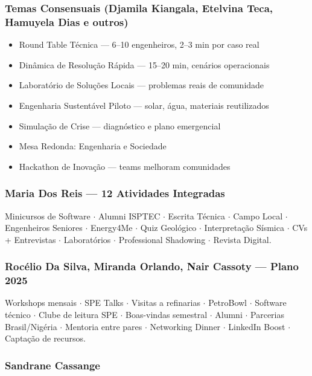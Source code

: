 \documentclass[12pt,a4paper]{article}
\begin{document}
\subsubsection*{Temas Consensuais (Djamila Kiangala, Etelvina Teca, Hamuyela Dias e outros)}

\begin{itemize}
    \item Round Table Técnica — 6–10 engenheiros, 2–3 min por caso real
    \item Dinâmica de Resolução Rápida — 15–20 min, cenários operacionais
    \item Laboratório de Soluções Locais — problemas reais de comunidade
    \item Engenharia Sustentável Piloto — solar, água, materiais reutilizados
    \item Simulação de Crise — diagnóstico e plano emergencial
    \item Mesa Redonda: Engenharia e Sociedade
    \item Hackathon de Inovação — teams melhoram comunidades
\end{itemize}

\subsubsection*{Maria Dos Reis — 12 Atividades Integradas}

Minicursos de Software $\cdot$ Alumni ISPTEC $\cdot$ Escrita Técnica $\cdot$ Campo Local $\cdot$ Engenheiros Seniores $\cdot$ Energy4Me $\cdot$ Quiz Geológico $\cdot$ Interpretação Sísmica $\cdot$ CVs + Entrevistas $\cdot$ Laboratórios $\cdot$ Professional Shadowing $\cdot$ Revista Digital.

\subsubsection*{Rocélio Da Silva, Miranda Orlando, Nair Cassoty — Plano 2025}

Workshops mensais $\cdot$ SPE Talks $\cdot$ Visitas a refinarias $\cdot$ PetroBowl $\cdot$ Software técnico $\cdot$ Clube de leitura SPE $\cdot$ Boas-vindas semestral $\cdot$ Alumni $\cdot$ Parcerias Brasil/Nigéria $\cdot$ Mentoria entre pares $\cdot$ Networking Dinner $\cdot$ LinkedIn Boost $\cdot$ Captação de recursos.

\subsubsection*{Sandrane Cassange}
\end{document}
